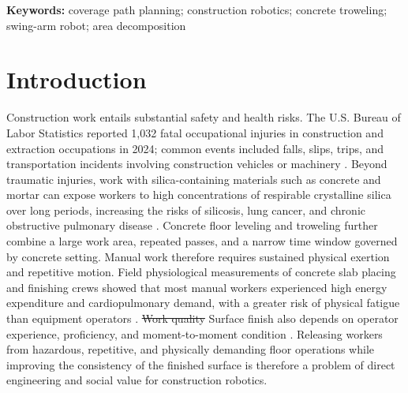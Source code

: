 \documentclass[a4paper,11pt]{article}
\makeatletter
\let\DIForigmarginpar\marginpar
\renewcommand{\marginpar}[1]{\DIForigmarginpar{\color{black}#1}}
\providecommand{\DIFaddtex}[1]{{\protect\color{blue}#1}} %
\providecommand{\DIFdeltex}[1]{{\protect\color{red}\sout{#1}}} %
\providecommand{\DIFaddbegin}{} %
\providecommand{\DIFaddend}{} %
\providecommand{\DIFdelbegin}{} %
\providecommand{\DIFdelend}{} %
\providecommand{\DIFadd}[1]{\texorpdfstring{\DIFaddtex{#1}}{#1}} %
\providecommand{\DIFdel}[1]{\texorpdfstring{\DIFdeltex{#1}}{}} %
\let\sout@orig\sout %
\renewcommand{\sout}[1]{\ifmmode\text{\sout@orig{\ensuremath{#1}}}\else\sout@orig{#1}\fi} %
\makeatother
\begin{document}
\begin{abstract}
the motion-feasibility checks. By contrast, the connecting segments produced by a fixed-width baseline leave the valid workspace by 4.51~m$^2$ and 20.00~m$^2$, making those routes non-executable. Experiments \DIFdelbegin \DIFdel{on five maps }\marginpar{\scriptsize [7] 删去 on five maps。}\DIFdelend further show that the bidirectional candidate strategy attains the highest mean full-trajectory coverage ratio (94.32\%) and the lowest mean total execution time (2316.60~s). These results support integrating complex-map decomposition, active arm motion, and continuous swept-area evaluation within a single planning pipeline. Validation in dynamic construction environments and on a physical robot remains future work.
\end{abstract}

\noindent\textbf{Keywords:} coverage path planning; construction robotics; concrete troweling; swing-arm robot; area decomposition

\section{Introduction}

Construction work entails substantial safety and health risks. The U.S. Bureau of Labor Statistics reported 1,032 fatal occupational injuries in construction and extraction occupations in 2024; common events included falls, slips, trips, and transportation incidents involving construction vehicles or machinery \cite{bls2024}. Beyond traumatic injuries, work with silica-containing materials such as concrete and mortar can expose workers to high concentrations of respirable crystalline silica over long periods, increasing the risks of silicosis, lung cancer, and chronic obstructive pulmonary disease \cite{niosh2024}. Concrete floor leveling and troweling further combine a large work area, repeated passes, and a narrow time window governed by concrete setting. Manual work therefore requires sustained physical exertion and repetitive motion. Field physiological measurements of concrete slab placing and finishing crews showed that most manual workers experienced high energy expenditure and cardiopulmonary demand, with a greater risk of physical fatigue than equipment operators \cite{abdelhamid1999}. \DIFdelbegin \DIFdel{Work quality }\DIFdelend \DIFaddbegin \DIFadd{Surface finish }\DIFaddend also depends on operator experience, proficiency, and moment-to-moment condition \cite{albers2004,kobayashi1996}. Releasing workers from hazardous, repetitive, and physically demanding floor operations while improving the consistency of the finished surface is therefore a problem of direct engineering and social value for construction robotics.
\end{document}
